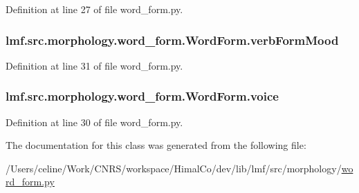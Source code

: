 Definition at line 27 of file word\+\_\+form.\+py.

\hypertarget{classlmf_1_1src_1_1morphology_1_1word__form_1_1_word_form_a47aea97a4bbd8cca9624b0143f639716}{
\subsubsection[{verb\+Form\+Mood}]{\setlength{\rightskip}{0pt plus 5cm}lmf.\+src.\+morphology.\+word\+\_\+form.\+Word\+Form.\+verb\+Form\+Mood}}\label{classlmf_1_1src_1_1morphology_1_1word__form_1_1_word_form_a47aea97a4bbd8cca9624b0143f639716}


Definition at line 31 of file word\+\_\+form.\+py.

\hypertarget{classlmf_1_1src_1_1morphology_1_1word__form_1_1_word_form_ac08b72f6837815d9d11d3cb0a36ed932}{
\subsubsection[{voice}]{\setlength{\rightskip}{0pt plus 5cm}lmf.\+src.\+morphology.\+word\+\_\+form.\+Word\+Form.\+voice}}\label{classlmf_1_1src_1_1morphology_1_1word__form_1_1_word_form_ac08b72f6837815d9d11d3cb0a36ed932}


Definition at line 30 of file word\+\_\+form.\+py.



The documentation for this class was generated from the following file\+:\begin{DoxyCompactItemize}
\item 
/\+Users/celine/\+Work/\+C\+N\+R\+S/workspace/\+Himal\+Co/dev/lib/lmf/src/morphology/\hyperlink{word__form_8py}{word\+\_\+form.\+py}\end{DoxyCompactItemize}
